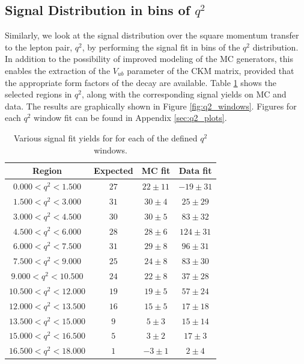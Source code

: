 \subsection{Signal Distribution in bins of \texorpdfstring{$q^2$}{q2}}
\label{sec:signal-distribution-in-bins-of-texorpdfstringq2q2}

Similarly, we look at the signal distribution over the square momentum transfer to the lepton pair, $q^2$, by performing the signal fit in bins of the $q^2$ distribution. In addition to the possibility of improved modeling of the MC generators, this enables the extraction of the $V_{ub}$ parameter of the CKM matrix, provided that the appropriate form factors of the decay are available. Table \ref{tab:q2_windows} shows the selected regions in $q^2$, along with the corresponding signal yields on MC and data. The results are graphically shown in Figure \ref{fig:q2_windows}. Figures for each $q^2$ window fit can be found in Appendix \ref{sec:q2_plots}.

\begin{table}[H]
	\centering
	\begin{tabular}{c|c|c|c}
		Region & Expected & MC fit & Data fit \\
		\toprule
		$0.000  < q^2 < 1.500$ & $27$ & $22 \pm 11$ & $-19 \pm 31$ \\
		$1.500  < q^2 < 3.000$ & $31$ & $30 \pm 4$ & $25 \pm 29$ \\
		$3.000  < q^2 < 4.500$ & $30$ & $30 \pm 5$ & $83 \pm 32$ \\
		$4.500  < q^2 < 6.000$ & $28$ & $28 \pm 6$ & $124 \pm 31$ \\
		$6.000  < q^2 < 7.500$ & $31$ & $29 \pm 8$ & $96 \pm 31$ \\
		$7.500  < q^2 < 9.000$ & $25$ & $24 \pm 8$ & $83 \pm 30$ \\
		$9.000  < q^2 < 10.500$ & $24$ & $22 \pm 8$ & $37 \pm 28$ \\
		$10.500  < q^2 < 12.000$ & $19$ & $19 \pm 5$ & $57 \pm 24$ \\
		$12.000  < q^2 < 13.500$ & $16$ & $15 \pm 5$ & $17 \pm 18$ \\
		$13.500  < q^2 < 15.000$ & $9$ & $5 \pm 3$ & $15 \pm 14$ \\
		$15.000  < q^2 < 16.500$ & $5$ & $3 \pm 2$ & $17 \pm 3$ \\
		$16.500  < q^2 < 18.000$ & $1$ & $-3 \pm 1$ & $2 \pm 4$ \\
		\bottomrule
	\end{tabular}
	\captionsetup{width=.8\linewidth}
	\caption{Various signal fit yields for for each of the defined $q^2$ windows.}
	\label{tab:q2_windows}
\end{table}


